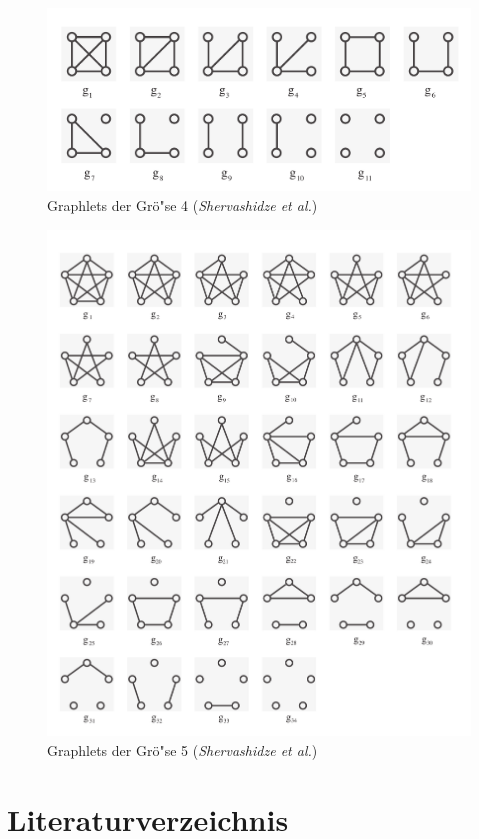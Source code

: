 \documentclass{report}
\begin{document}
\begin{figure}[h]
\includegraphics[width =\linewidth]{4graphlets.pdf}
\caption{Graphlets der Gr\"o"se 4 (\textit{Shervashidze et al.})}
\label{fig:4graphlets2}
\end{figure}

\begin{figure}[h]
\includegraphics[width =\linewidth]{5graphlets.pdf}
\caption{Graphlets der Gr\"o"se 5 (\textit{Shervashidze et al.})}
\label{fig:5graphlets}
\end{figure}




\section{Literaturverzeichnis}




\end{document}
